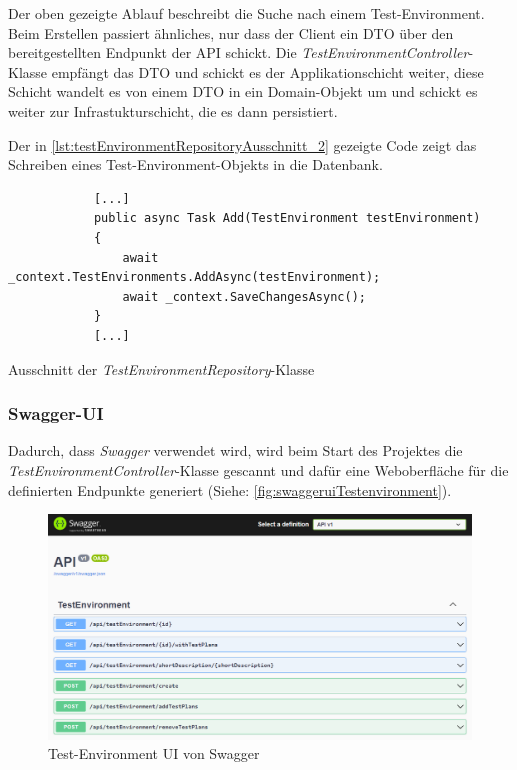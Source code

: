 \documentclass[a4paper, fontsize=11pt, parskip=half, twoside]{scrreprt}
\begin{document}
	Der oben gezeigte Ablauf beschreibt die Suche nach einem Test-Environment. 
	Beim Erstellen passiert ähnliches, nur dass der Client ein \ac{DTO} über den bereitgestellten Endpunkt der \ac{API} schickt.
	Die \emph{TestEnvironmentController}-Klasse empfängt das \ac{DTO} und schickt es der Applikationschicht weiter, diese Schicht wandelt es von einem \ac{DTO} in ein Domain-Objekt um und schickt es weiter zur Infrastukturschicht, die es dann persistiert.
	
	Der in \autoref{lst:testEnvironmentRepositoryAusschnitt_2} gezeigte Code zeigt das Schreiben eines Test-Environment-Objekts in die Datenbank.
	
	\begin{listing}[!htb]
		\begin{verbatim}
			[...]	
			public async Task Add(TestEnvironment testEnvironment)
			{
				await _context.TestEnvironments.AddAsync(testEnvironment);
				await _context.SaveChangesAsync();
			}
			[...]
		\end{verbatim}
		\caption{Ausschnitt der \emph{TestEnvironmentRepository}-Klasse}
		\label{lst:testEnvironmentRepositoryAusschnitt_2}
	\end{listing}
	
	\subsubsection{Swagger-UI}
	Dadurch, dass \emph{Swagger} verwendet wird, wird beim Start des Projektes die \emph{TestEnvironmentController}-Klasse gescannt und dafür eine Weboberfläche für die definierten Endpunkte generiert (Siehe: \autoref{fig:swaggeruiTestenvironment}).
	
	\begin{figure}[ht]
		\centering
		\includegraphics[scale=0.5]{assets/swaggerui_testenvironment.png}
		\caption{Test-Environment \ac{UI} von Swagger}
		\label{fig:swaggeruiTestenvironment}
	\end{figure}
	
\end{document}
